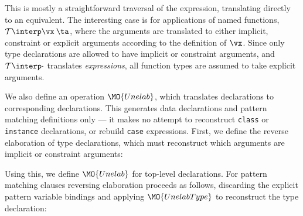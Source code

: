 \noindent
This is mostly a straightforward
traversal of the \TT{} expression, translating directly to an \Idris{} equivalent.
The interesting case is for applications of named functions,
$\uninterp{\vx\:\ta}$, where the arguments are translated to either implicit,
constraint or explicit arguments according to the definition of $\vx$.
Since only type declarations are allowed to have implicit or constraint arguments,
and $\uninterp{\cdot}$ translates \emph{expressions},
all function types are assumed to take explicit arguments.

We also define an operation $\MO{Unelab}$, which translates \TT{} declarations
to corresponding \Idris{} declarations. This generates data declarations and
pattern matching definitions only --- it makes no attempt to reconstruct 
\texttt{class}
or \texttt{instance} declarations, or rebuild \texttt{case} expressions.
First, we define the reverse elaboration of type declarations, which must reconstruct
which arguments are implicit or constraint arguments:


\noindent
Using this, we define $\MO{Unelab}$ for top-level declarations. For pattern
matching clauses reversing elaboration proceeds as follows, discarding the explicit
pattern variable bindings and applying $\MO{UnelabType}$ to reconstruct
the type declaration:


